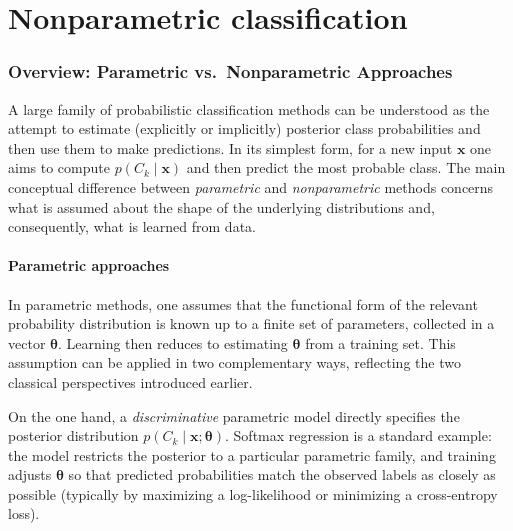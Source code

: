 
\chapter{Nonparametric classification}


\subsection*{Overview: Parametric vs.\ Nonparametric Approaches}

A large family of probabilistic classification methods can be understood as the attempt to estimate (explicitly or implicitly) posterior class probabilities and then use them to make predictions. In its simplest form, for a new input \(\mathbf{x}\) one aims to compute \(p(C_k \mid \mathbf{x})\) and then predict the most probable class. The main conceptual difference between \emph{parametric} and \emph{nonparametric} methods concerns what is assumed about the shape of the underlying distributions and, consequently, what is learned from data.

\subsubsection*{Parametric approaches}

In parametric methods, one assumes that the functional form of the relevant probability distribution is known up to a finite set of parameters, collected in a vector \(\boldsymbol{\theta}\). Learning then reduces to estimating \(\boldsymbol{\theta}\) from a training set. This assumption can be applied in two complementary ways, reflecting the two classical perspectives introduced earlier.

On the one hand, a \emph{discriminative} parametric model directly specifies the posterior distribution \(p(C_k \mid \mathbf{x}; \boldsymbol{\theta})\). Softmax regression is a standard example: the model restricts the posterior to a particular parametric family, and training adjusts \(\boldsymbol{\theta}\) so that predicted probabilities match the observed labels as closely as possible (typically by maximizing a log-likelihood or minimizing a cross-entropy loss).

